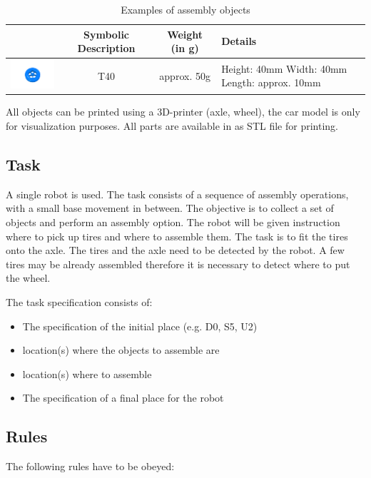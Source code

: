 \begin{table}[p]
\begin{tabular}{|c|c|c|p{5cm}|}
\hline 
 & Symbolic Description & Weight (in g) & Details \\ 
\hline 
\includegraphics[width=3cm]{./images/BAT_Tire.png}  & T40 & approx. 50g & Height: 40mm \newline
 Width: 40mm \newline
 Length: approx. 10mm \\ 
\hline 
\end{tabular} 

\label{tab:bat_objects}
\caption{Examples of assembly objects}
\end{table}

All objects can be printed using a 3D-printer (axle, wheel), the car model is only for visualization purposes. All parts are available in as STL file for printing.

\subsection{Task}
A single robot is used. The task consists of a sequence of assembly operations, with a small base movement in between. The objective is to collect a set of objects and perform an assembly option. The robot will be given instruction where to pick up tires and where to assemble them. The task is to fit the tires onto the axle. The tires and the axle need to be detected by the robot. A few tires may be already assembled therefore it is necessary to detect where to put the wheel.

\par
The task specification consists of: 
\begin{itemize}
	\item The specification of the initial place (e.g. D0, S5, U2)
	\item location(s) where the objects to assemble are
	\item location(s) where to assemble
	\item The specification of a final place for the robot 
\end{itemize}

\subsection{Rules}
The following rules have to be obeyed:


